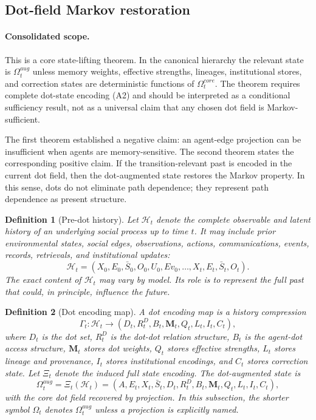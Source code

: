 \documentclass[11pt]{article}
\newtheorem{definition}{Definition}
\theoremstyle{remark}
\begin{document}
\subsection{Dot-field Markov restoration}\label{dot-field-markov-restoration}

\paragraph{Consolidated scope.} This is a core state-lifting theorem. In the canonical hierarchy the relevant state is $\Omega_t^{aug}$ unless memory weights, effective strengths, lineages, institutional stores, and correction states are deterministic functions of $\Omega_t^{core}$. The theorem requires complete dot-state encoding (A2) and should be interpreted as a conditional sufficiency result, not as a universal claim that any chosen dot field is Markov-sufficient.

The first theorem established a negative claim: an agent-edge projection
can be insufficient when agents are memory-sensitive. The second theorem
states the corresponding positive claim. If the transition-relevant past
is encoded in the current dot field, then the dot-augmented state
restores the Markov property. In this sense, dots do not eliminate path
dependence; they represent path dependence as present structure.

\begin{definition}[Pre-dot history]
Let $\mathcal{H}_t$ denote the complete observable and latent history of
an underlying social process up to time $t$. It may include prior
environmental states, social edges, observations, actions,
communications, events, records, retrievals, and institutional updates:
$$
\mathcal{H}_t=(X_0,E_0,\bar S_0,O_0,U_0,Ev_0,\ldots,X_t,E_t,\bar S_t,O_t).
$$
The exact content of $\mathcal{H}_t$ may vary by model. Its role is to
represent the full past that could, in principle, influence the future.
\end{definition}

\begin{definition}[Dot encoding map]
A dot encoding map is a history compression
$$
\Gamma_t:\mathcal{H}_t\rightarrow (D_t,R_t^D,B_t,\mathbf M_t,Q_t,L_t,I_t,C_t),
$$
where $D_t$ is the dot set, $R_t^D$ is the dot-dot relation structure, $B_t$ is the agent-dot access structure, $\mathbf M_t$ stores dot weights, $Q_t$ stores effective strengths, $L_t$ stores lineage and provenance, $I_t$ stores institutional encodings, and $C_t$ stores correction state. Let $\Xi_t$ denote the induced full state encoding. The dot-augmented state is
$$
\Omega_t^{aug}=\Xi_t(\mathcal{H}_t)=(A,E_t,X_t,\bar S_t,D_t,R_t^D,B_t,\mathbf M_t,Q_t,L_t,I_t,C_t),
$$
with the core dot field recovered by projection. In this subsection, the shorter symbol $\Omega_t$ denotes $\Omega_t^{aug}$ unless a projection is explicitly named.
\end{definition}
\end{document}
